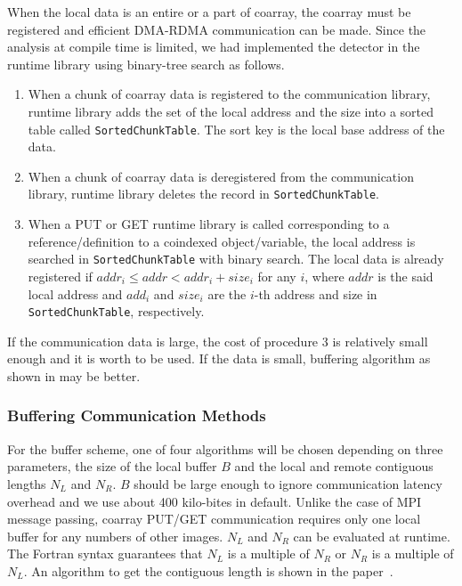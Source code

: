 When the local data is an entire or a part of coarray,
the coarray must be registered and efficient DMA-RDMA communication can 
be made. Since the analysis at compile time is limited,
we had implemented the detector in the runtime library 
using binary-tree search as follows.
%
\begin{enumerate}
\item
When a chunk of coarray data is registered to the communication library, 
runtime library adds the set of the local address and the size into a sorted 
table called {\tt SortedChunkTable}. The sort key is the local base address
of the data.
\item
When a chunk of coarray data is deregistered from the communication library, 
runtime library deletes the record in {\tt SortedChunkTable}.
\item
When a PUT or GET runtime library is called corresponding to a reference/definition
to a coindexed object/variable, the local address is searched in {\tt SortedChunkTable}
with binary search. The local data is already registered if 
$addr_i \leq addr < addr_i + size_i$ for any $i$,
where $addr$ is the said local address and $add_i$ and $size_i$ are the
$i$-th address and size in {\tt SortedChunkTable}, respectively.
\end{enumerate}

If the communication data is large, the cost of procedure 3 is relatively small enough
and it is worth to be used. 
If the data is small, buffering algorithm as shown in  may be better.


\subsubsection{Buffering Communication Methods}\label{sec:buffer}

For the buffer scheme, one of four algorithms will be chosen 
depending on three parameters, the size of the local buffer $B$ and the 
local and remote contiguous lengths $N_L$ and $N_R$.
$B$ should be large enough to ignore communication latency overhead and we use
about 400 kilo-bites in default. Unlike the case of MPI message passing,
coarray PUT/GET communication requires only one local buffer for any numbers of
other images.
$N_L$ and $N_R$ can be evaluated at runtime. The Fortran syntax guarantees 
that $N_L$ is a multiple of $N_R$ or $N_R$ is a multiple of $N_L$.
An algorithm to get the contiguous length is shown in the paper~\cite{pgas15}.

